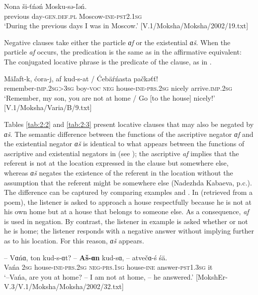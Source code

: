 \documentclass[output=paper]{langsci/langscibook}
\begin{document}
\ea\label{ex:moksha-Moscow}
\gll Nona ši-ťńəń Mosku-sə-ľəń.\\
previous day-\textsc{gen.def.pl} Moscow-\textsc{ine-pst2.1sg}\\
\glt `During the previous days I was in Moscow.' [V.1/Moksha/Moksha/2002/19.txt]
\z

  Negative clauses take either the particle \textit{ɑf} or the existential \textit{ɑš}. When the particle \textit{af} occurs, the predication is the same as in the affirmative equivalent: The conjugated locative phrase is the predicate of the clause, as in .

\ea\label{ex:moksha-nicely}
\gll Mäľaft-k, ćora-j, af kud-s-at / \'Cebäŕńasta pačkəťť!\\
remember-\textsc{imp.2sg>3sg} boy-\textsc{voc} \textsc{neg} house-\textsc{ine-prs.2sg} {} nicely arrive.\textsc{imp.2sg}\\
\glt `Remember, my son, you are not at home / Go [to the house] nicely!' [V.1/Moksha/Varia/B/9.txt]
\z

  Tables \ref{tab:2:2} and \ref{tab:2:3} present locative clauses that may also be negated by \textit{ɑš}. The semantic difference between the functions of the ascriptive negator \textit{ɑf} and the existential negator \textit{ɑš} is identical to what appears between the functions of ascriptive and existential negators in  (see \citealt[91]{Hamari2007}); the ascriptive \textit{af} implies that the referent is not at the location expressed in the clause but somewhere else, whereas \textit{ɑš} negates the existence of the referent in the location without the assumption that the referent might be somewhere else (Nadezhda Kabaeva, p.c.). The difference can be captured by comparing examples  and . In  (retrieved from a poem), the listener is asked to approach a house respectfully because he is not at his own home but at a house that belongs to someone else. As a consequence, \textit{af} is used in negation. By contrast, the listener in example  is asked whether or not he is home; the listener responds with a negative answer without implying further as to his location. For this reason, \textit{ɑš} appears.

\ea\label{ex:moksha-Vanja}
\gll -- Vɑńɑ, ton kud-s-ɑt? -- \textbf{Aš-ɑn} kud-sɑ, -- atvečɑ-ś śä.\\
{} Vańa \textsc{2sg} house-\textsc{ine-prs.2sg} {} \textsc{neg-prs.1sg} house-\textsc{ine} {} answer-\textsc{pst1.3sg} it\\
\glt `--Vańa, are you at home? -- I am not at home, -- he answered.' [MokshEr-V.3/V.1/Moksha/Moksha/2002/32.txt]
\z
\end{document}
